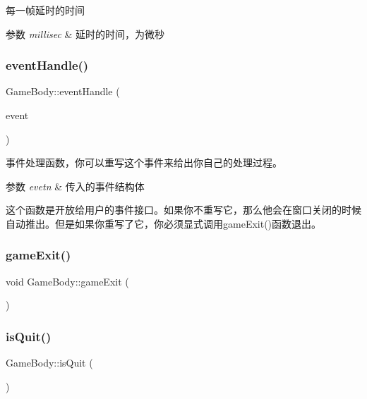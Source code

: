 每一帧延时的时间 


\begin{DoxyParams}{参数}
{\em millisec} & 延时的时间，为微秒 \\
\hline
\end{DoxyParams}
\mbox{\label{class_game_body_a62e1c8511e6bf91ea4ed7a46ebc50e8d}} 
\subsubsection{\texorpdfstring{eventHandle()}{eventHandle()}}
{\footnotesize\ttfamily Game\+Body\+::event\+Handle (\begin{DoxyParamCaption}\item[{S\+D\+L\+\_\+\+Event \&}]{event }\end{DoxyParamCaption})\hspace{0.3cm}{\ttfamily [virtual]}}



事件处理函数，你可以重写这个事件来给出你自己的处理过程。 


\begin{DoxyParams}{参数}
{\em evetn} & 传入的事件结构体\\
\hline
\end{DoxyParams}
这个函数是开放给用户的事件接口。如果你不重写它，那么他会在窗口关闭的时候自动推出。但是如果你重写了它，你必须显式调用game\+Exit()函数退出。 \mbox{\label{class_game_body_a45b3ecd1c3440b75a5316e322a2698e5}} 
\subsubsection{\texorpdfstring{gameExit()}{gameExit()}}
{\footnotesize\ttfamily void Game\+Body\+::game\+Exit (\begin{DoxyParamCaption}{ }\end{DoxyParamCaption})\hspace{0.3cm}{\ttfamily [inline]}}

\mbox{\label{class_game_body_a9ec4c012ae72dd25d849d6ebacb9357c}} 
\subsubsection{\texorpdfstring{isQuit()}{isQuit()}}
{\footnotesize\ttfamily Game\+Body\+::is\+Quit (\begin{DoxyParamCaption}{ }\end{DoxyParamCaption})\hspace{0.3cm}{\ttfamily [inline]}}



